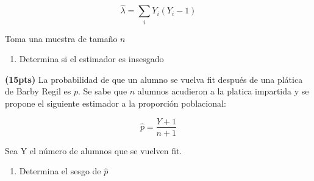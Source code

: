 \documentclass[addpoints]{exam}
\theoremstyle{mytheor}
\begin{document}
\begin{questions}
$$\hat{\lambda} = \sum_i Y_i(Y_i-1) $$

Toma una muestra de tamaño $n$

\begin{enumerate}[label=\Alph*)]
\item Determina si el estimador es insesgado
\end{enumerate}


\question \textbf{(15pts)} La probabilidad de que un alumno se vuelva fit después de una plática de Barby Regil es $p$. Se sabe que $n$ alumnos acudieron a la platica impartida y se propone el siguiente estimador a la proporción poblacional:

$$\hat{p} = \frac{Y+1}{n+1}$$

Sea Y el número de alumnos que se vuelven fit. 

\begin{enumerate}[label=\Alph*)]
\item Determina el sesgo de $\hat{p}$
\end{enumerate}


  \end{questions}
  
\end{document}

